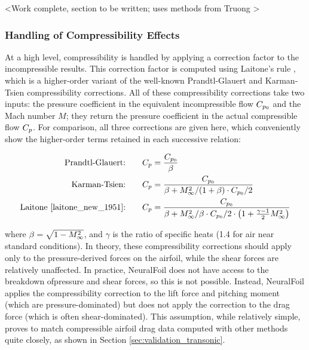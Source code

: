 \documentclass[conf]{new-aiaa}
\begin{document}
    <Work complete, section to be written; uses methods from Truong \cite{truong_analytical_2020}>

    \subsubsection{Handling of Compressibility Effects}
    \label{sec:compressibility}

    At a high level, compressibility is handled by applying a correction factor to the incompressible results. This correction factor is computed using Laitone's rule \cite{laitone_new_1951}, which is a higher-order variant of the well-known Prandtl-Glauert and Karman-Tsien compressibility corrections. All of these compressibility corrections take two inputs: the pressure coefficient in the equivalent incompressible flow $C_{p_0}$ and the Mach number $M$; they return the pressure coefficient in the actual compressible flow $C_p$. For comparison, all three corrections are given here, which conveniently show the higher-order terms retained in each successive relation:

    \begin{align}
        \label{eq:prandtl-glauert} \text{Prandtl-Glauert:} \qquad & C_p = \frac{C_{p_0}}{\beta} \\
        \label{eq:karman-tsien} \text{Karman-Tsien:}\qquad    & C_p = \frac{C_{p_0}}{\beta + M_\infty^2 / (1 + \beta) \cdot C_{p_0} / 2} \\
        \label{eq:laitone} \text{Laitone \cite{laitone_new_1951}:}\qquad & C_p = \frac{C_{p_0}}{\beta + M_\infty^2 / \beta \cdot C_{p_0} / 2 \cdot \left( 1 + \frac{\gamma - 1}{2} M_\infty^2 \right)}
    \end{align}

    \noindent where $\beta = \sqrt{1- M_\infty^2}$, and $\gamma$ is the ratio of specific heats (1.4 for air near standard conditions). In theory, these compressibility corrections should apply only to the pressure-derived forces on the airfoil, while the shear forces are relatively unaffected. In practice, NeuralFoil does not have access to the breakdown ofpressure and shear forces, so this is not possible. Instead, NeuralFoil applies the compressibility correction to the lift force and pitching moment (which are pressure-dominated) but does not apply the correction to the drag force (which is often shear-dominated). This assumption, while relatively simple, proves to match compressible airfoil drag data computed with other methods quite closely, as shown in Section \ref{sec:validation_transonic}.
\end{document}

